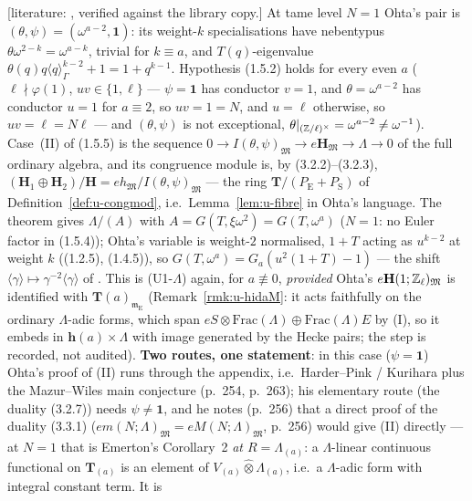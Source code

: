 \documentclass[11pt]{article}
\newcommand{\LIT}[1]{\textsf{[literature: #1]}}   %
\newcommand{\Iw}{\Lambda}                         %
\newcommand{\hcusp}{\mathbf{h}}                   %
\newcommand{\Tu}{\mathbf{T}}                      %
\newcommand{\Eis}{\mathrm{E}}
\newcommand{\cusp}{\mathrm{S}}
\newcommand{\Zl}{\Z_\ell}
\begin{document}
\begin{remark}\label{rmk:u-ohta}
\LIT{\cite[Thm.~(1.5.5), p.~238; (1.1.4), (1.1.6), p.~229--230; (3.2.2)--(3.2.3), p.~253--254; (1.4.5), p.~235; Appendix~A.1, p.~265]{ohta_cong}, verified against
the library copy.} At tame level $N=1$ Ohta's pair is $(\theta,\psi)=(\omega^{a-2},\mathbf1)$: its weight-$k$ specialisations have nebentypus $\theta\omega^{2-k}=\omega^{a-k}$,
trivial for $k\equiv a$, and $T(q)$-eigenvalue $\theta(q)q\langle q\rangle_\Gamma^{k-2}+1=1+q^{k-1}$. Hypothesis (1.5.2) holds for every even $a$ ($\ell\nmid\varphi(1)$, $uv\in\{1,\ell\}$ ---
$\psi=\mathbf1$ has conductor $v=1$, and $\theta=\omega^{a-2}$ has conductor $u=1$ for $a\equiv2$, so $uv=1=N$, and $u=\ell$ otherwise, so $uv=\ell=N\ell$ ---
and $(\theta,\psi)$ is not exceptional, $\theta|_{(\mathbb{Z}/\ell)^\times}=\omega^{a-2}\ne\omega^{-1}$). Case~(II) of (1.5.5) is the sequence $0\to I(\theta,\psi)_{\mathfrak M}\to e\mathbf
H_{\mathfrak M}\to\Iw\to0$ of the full ordinary algebra, and its congruence module is, by (3.2.2)--(3.2.3), $(\mathbf H_1\oplus\mathbf H_2)/\mathbf H=e h_{\mathfrak M}/I(\theta,\psi)_{\mathfrak M}$ ---
the ring $\Tu/(P_\Eis+P_\cusp)$ of Definition~\ref{def:u-congmod}, i.e.\ Lemma~\ref{lem:u-fibre} in Ohta's language. The theorem gives $\Iw/(A)$ with
$A=G(T,\xi\omega^{2})=G(T,\omega^{a})$ ($N=1$: no Euler factor in (1.5.4)); Ohta's variable is weight-$2$ normalised, $1+T$ acting as $u^{k-2}$ at weight $k$
((1.2.5), (1.4.5)), so $G(T,\omega^{a})=G_a(u^{2}(1+T)-1)$ --- the shift $\langle\gamma\rangle\mapsto\gamma^{-2}\langle\gamma\rangle$ of \cite[p.~7]{emerton_eis}. This is (U1-$\Iw$)
again, for $a\not\equiv0$, \emph{provided} Ohta's $e\mathbf H(1;\Zl)_{\mathfrak M}$ is identified with $\Tu(a)_{\mathfrak m_\Eis}$ (Remark~\ref{rmk:u-hidaM}: it acts faithfully on
the ordinary $\Iw$-adic forms, which span $e S\otimes\mathrm{Frac}(\Iw)\oplus\mathrm{Frac}(\Iw)E$ by (I), so it embeds in $\hcusp(a)\times\Iw$ with image generated by the Hecke pairs;
the step is recorded, not audited). \textbf{Two routes, one statement}: in this case ($\psi=\mathbf1$) Ohta's proof of (II) runs through the appendix, i.e.\ Harder--Pink /
Kurihara plus the Mazur--Wiles main conjecture (p.~254, p.~263); his elementary route (the duality (3.2.7)) needs $\psi\ne\mathbf1$, and he notes (p.~256) that a direct proof of
the duality (3.3.1) ($em(N;\Iw)_{\mathfrak M}=eM(N;\Iw)_{\mathfrak M}$, p.~256) would give (II) directly --- at $N=1$ that is Emerton's Corollary~2 \emph{at $R=\Iw_{(a)}$}: a
$\Iw$-linear continuous functional on $\mathbf T_{(a)}$ is an element of $V_{(a)}\hat\otimes\Iw_{(a)}$, i.e.\ a $\Iw$-adic form with integral constant term. It is

\end{remark}
\end{document}
